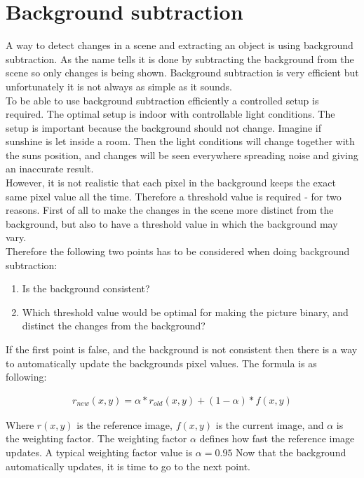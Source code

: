 \section{Background subtraction}
A way to detect changes in a scene and extracting an object is using background subtraction. As the name tells it is done by subtracting the background from the scene so only changes is being shown. Background subtraction is very efficient but unfortunately it is not always as simple as it sounds. \\
To be able to use background subtraction efficiently a controlled setup is required. The optimal setup is indoor with controllable light conditions. The setup is important because the background should not change. Imagine if sunshine is let inside a room. Then the light conditions will change together with the suns position, and changes will be seen everywhere spreading noise and giving an inaccurate result. \\
However, it is not realistic that each pixel in the background keeps the exact same pixel value all the time. Therefore a threshold value is required - for two reasons. First of all to make the changes in the scene more distinct from the background, but also to have a threshold value in which the background may vary. \\
Therefore the following two points has to be considered when doing background subtraction:
\begin{enumerate} 
	\item Is the background consistent? 
	\item Which threshold value would be optimal for making the picture binary, and distinct the changes from the background? 
\end{enumerate}

If the first point is false, and the background is not consistent then there is a way to automatically update the backgrounds pixel values. The formula is as following:

\begin{equation}
	\begin{aligned}
  		r_{new}(x,y)=\alpha*r_{old}(x,y)+(1-\alpha)*f(x,y)
		\label{AutomaticBackground}  
 	\end{aligned}
\end{equation}  

Where $r(x,y)$ is the reference image, $f(x,y)$ is the current image, and $\alpha$ is the weighting factor. The weighting factor $\alpha$ defines how fast the reference image updates. A typical weighting factor value is  $\alpha = 0.95$
Now that the background automatically updates, it is time to go to the next point.


